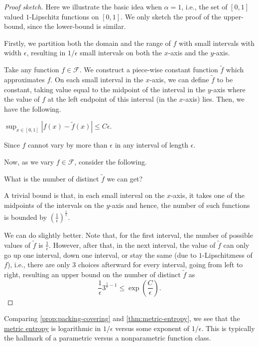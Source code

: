 \begin{proof}[Proof sketch]
	Here we illustrate the basic idea when \(\alpha = 1\), i.e., the set of \([0,1]\) valued \(1\)-Lipschitz functions on \([0,1]\). We only sketch the proof of the upper-bound, since the lower-bound is similar.

	Firstly, we partition both the domain and the range of \(f\) with small intervals with width \(\epsilon\), resulting in \(1/\epsilon\) small intervals on both the \(x\)-axis and the \(y\)-axis.

	Take any function \(f \in \mathscr{F} \). We construct a piece-wise constant function \(\widetilde{f}\) which approximates \(f\). On each small interval in the \(x\)-axis, we can define \(\widetilde{f}\) to be constant, taking value equal to the midpoint of the interval in the \(y\)-axis where the value of \(f\) at the left endpoint of this interval (in the \(x\)-axis) lies. Then, we have the following.
	\begin{claim}
		\(\sup_{x \in [0,1]} |f(x) - \widetilde{f}(x)| \leq C \epsilon\).
	\end{claim}
	\begin{explanation}
		Since \(f\) cannot vary by more than \(\epsilon\) in any interval of length \(\epsilon\).
	\end{explanation}

	Now, as we vary \(f \in \mathscr{F} \), consider the following.

	\begin{problem*}
		What is the number of distinct \(\widetilde{f}\) we can get?
	\end{problem*}
	A trivial bound is that, in each small interval on the \(x\)-axis, it takes one of the midpoints of the intervals on the \(y\)-axis and hence, the number of such functions is bounded by \((\frac{1}{\epsilon})^{\frac{1}{\epsilon}}\).

	We can do slightly better. Note that, for the first interval, the number of possible values of \(\widetilde{f}\) is \(\frac{1}{\epsilon}\). However, after that, in the next interval, the value of \(\widetilde{f}\) can only go up one interval, down one interval, or stay the same (due to \(1\)-Lipschitzness of \(f\)), i.e., there are only \(3\) choices afterward for every interval, going from left to right, resulting an upper bound on the number of distinct \(\widetilde{f}\) as
	\[
		\frac{1}{\epsilon} 3^{\frac{1}{\epsilon} - 1} \leq \exp(\frac{C}{\epsilon}).
	\]
\end{proof}

\begin{remark}
	Comparing \autoref{prop:packing-covering} and \autoref{thm:metric-entropy}, we see that the \hyperref[def:metric-entropy]{metric entropy} is logarithmic in \(1 / \epsilon \) versus some exponent of \(1 / \epsilon \). This is typically the hallmark of a parametric versus a nonparametric function class.
\end{remark}
